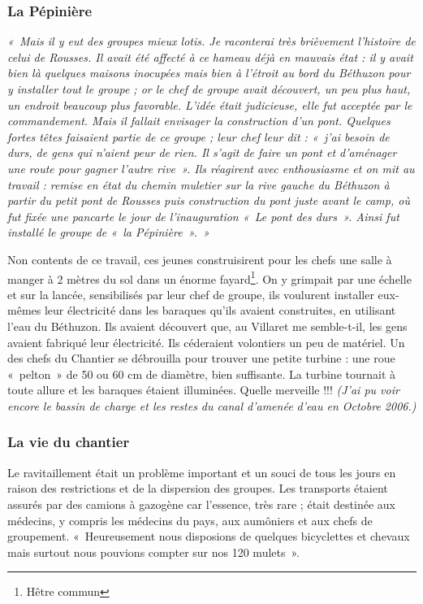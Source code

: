 \subsubsection{La Pépinière}

\emph{«~Mais il y eut des groupes mieux lotis. Je raconterai très brièvement l’histoire de
celui de Rousses. Il avait été affecté à ce hameau déjà en mauvais état : il y avait
bien là quelques maisons inocupées mais bien à l’étroit au bord du Béthuzon pour y
installer tout le groupe ; or le chef de groupe avait découvert, un peu plus haut, un
endroit beaucoup plus favorable. L’idée était judicieuse, elle fut acceptée par le
commandement. Mais il fallait envisager la construction d’un pont. Quelques fortes
têtes faisaient partie de ce groupe ; leur chef leur dit : «~j’ai besoin de durs, de gens
qui n’aient peur de rien. Il s’agit de faire un pont et d’aménager une route pour
gagner l’autre rive~». Ils réagirent avec enthousiasme et on mit au travail :
remise en état du chemin muletier sur la rive gauche du Béthuzon à partir du petit
pont de Rousses puis construction du pont juste avant le camp, où fut fixée une
pancarte le jour de l’inauguration «~Le pont des durs~». Ainsi fut installé le groupe
de «~la Pépinière~».~»}

Non contents de ce travail, ces jeunes construisirent pour les chefs une salle à
manger à 2 mètres du sol dans un énorme fayard\footnote{Hêtre commun}. On y grimpait par une échelle et sur
la lancée, sensibilisés par leur chef de groupe, ils voulurent installer eux-mêmes leur
électricité dans les baraques qu’ils avaient construites, en utilisant l’eau du
Béthuzon. Ils avaient découvert que, au Villaret me semble-t-il, les gens avaient
fabriqué leur électricité. Ils céderaient volontiers un peu de matériel. Un des chefs
du Chantier se débrouilla pour trouver une petite turbine : une roue «~pelton~» de 50
ou 60 cm de diamètre, bien suffisante. La turbine tournait à toute allure et les
baraques étaient illuminées. Quelle merveille !!! \emph{(J’ai pu voir encore le bassin de
charge et les restes du canal d’amenée d’eau en Octobre 2006.)}

\subsubsection{La vie du chantier}

Le ravitaillement était un problème important et un souci de tous les jours en raison
des restrictions et de la dispersion des groupes.
Les transports étaient assurés par des camions à gazogène car l’essence, très rare ;
était destinée aux médecins, y compris les médecins du pays, aux aumôniers et aux
chefs de groupement. «~Heureusement nous disposions de quelques bicyclettes et
chevaux mais surtout nous pouvions compter sur nos 120 mulets~».

